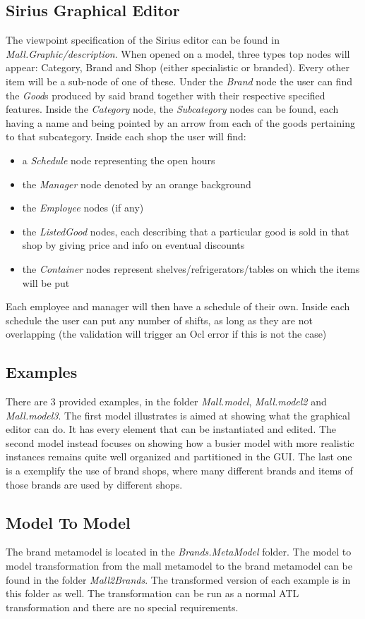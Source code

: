 \documentclass[a4paper]{article}
\begin{document}
\subsection{Sirius Graphical Editor}
The viewpoint specification of the Sirius editor can be found in \textit{Mall.Graphic/description}. When opened on a model, three types top nodes will appear: Category, Brand and Shop (either specialistic or branded). Every other item will be a sub-node of one of these. Under the \textit{Brand} node the user can find the \textit{Good}s produced by said brand together with their respective specified features. Inside the \textit{Category} node, the \textit{Subcategory} nodes can be found, each having a name and being pointed by an arrow from each of the goods pertaining to that subcategory. 
Inside each shop the user will find:
\begin{itemize}
	\item a \textit{Schedule} node representing the open hours
	\item the \textit{Manager} node denoted by an orange background
	\item the \textit{Employee} nodes (if any)
	\item the \textit{ListedGood} nodes, each describing that a particular good is sold in that shop by giving price and info on eventual discounts
	\item the \textit{Container} nodes represent shelves/refrigerators/tables on which the items will be put
\end{itemize}
Each employee and manager will then have a schedule of their own. Inside each schedule the user can put any number of shifts, as long as they are not overlapping (the validation will trigger an Ocl error if this is not the case)

\subsection{Examples}
There are 3 provided examples, in the folder \textit{Mall.model}, \textit{Mall.model2} and \textit{Mall.model3}.
The first model illustrates is aimed at showing what the graphical editor can do. It has every element that can be instantiated and edited.
The second model instead focuses on showing how a busier model with more realistic instances remains quite well organized and partitioned in the GUI.
The last one is a exemplify the use of brand shops, where many different brands and items of those brands are used by different shops.

\subsection{Model To Model}
The brand metamodel is located in the \textit{Brands.MetaModel} folder.
The model to model transformation from the mall metamodel to the brand metamodel can be found in the folder \textit{Mall2Brands}.  The transformed version of each example is in this folder as well. 
The transformation can be run as a normal ATL transformation and there are no special requirements. 
\end{document}
